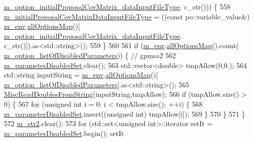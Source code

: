 \begin{DoxyCode}
{      \hyperlink{class_q_u_e_s_o_1_1_m_l_sampling_level_options_a75a15f2c496d82ce310669fb9de753c5}{m\_option\_initialProposalCovMatrix\_dataInputFileType}.
      c\_str())) \{
558     \hyperlink{class_q_u_e_s_o_1_1_m_l_sampling_level_options_a6e6ea2f36afd7b6a6900eaf44165a796}{m\_initialProposalCovMatrixDataInputFileType} = ((\textcolor{keyword}{const} 
      po::variable\_value&) \hyperlink{class_q_u_e_s_o_1_1_m_l_sampling_level_options_a5bdc1fb3f6eb46f73feec9c356c9a1b8}{m\_env}.\hyperlink{class_q_u_e_s_o_1_1_base_environment_ae7cee155956e0e70112f45e2ad1f02c8}{allOptionsMap}()[
      \hyperlink{class_q_u_e_s_o_1_1_m_l_sampling_level_options_a75a15f2c496d82ce310669fb9de753c5}{m\_option\_initialProposalCovMatrix\_dataInputFileType}.
      c\_str()]).as<std::string>();
559   \}
560 
561   \textcolor{keywordflow}{if} (\hyperlink{class_q_u_e_s_o_1_1_m_l_sampling_level_options_a5bdc1fb3f6eb46f73feec9c356c9a1b8}{m\_env}.\hyperlink{class_q_u_e_s_o_1_1_base_environment_ae7cee155956e0e70112f45e2ad1f02c8}{allOptionsMap}().count(
      \hyperlink{class_q_u_e_s_o_1_1_m_l_sampling_level_options_a296043cd6f00282ccf1a39e219aa16ef}{m\_option\_listOfDisabledParameters})) \{ \textcolor{comment}{// gpmsa2}
562     \hyperlink{class_q_u_e_s_o_1_1_m_l_sampling_level_options_a0c5c308a5b9e0150be59ad52a48e6ab9}{m\_parameterDisabledSet}.clear();
563     std::vector<double> tmpAllow(0,0.);
564     std::string inputString = \hyperlink{class_q_u_e_s_o_1_1_m_l_sampling_level_options_a5bdc1fb3f6eb46f73feec9c356c9a1b8}{m\_env}.\hyperlink{class_q_u_e_s_o_1_1_base_environment_ae7cee155956e0e70112f45e2ad1f02c8}{allOptionsMap}()[
      \hyperlink{class_q_u_e_s_o_1_1_m_l_sampling_level_options_a296043cd6f00282ccf1a39e219aa16ef}{m\_option\_listOfDisabledParameters}].as<std::string>();
565     \hyperlink{namespace_q_u_e_s_o_ac3fab438679d1dc864f8d629881dad2e}{MiscReadDoublesFromString}(inputString,tmpAllow);
566     \textcolor{keywordflow}{if} (tmpAllow.size() > 0) \{
567       \textcolor{keywordflow}{for} (\textcolor{keywordtype}{unsigned} \textcolor{keywordtype}{int} i = 0; i < tmpAllow.size(); ++i) \{
568         \hyperlink{class_q_u_e_s_o_1_1_m_l_sampling_level_options_a0c5c308a5b9e0150be59ad52a48e6ab9}{m\_parameterDisabledSet}.insert((\textcolor{keywordtype}{unsigned} \textcolor{keywordtype}{int}) tmpAllow[i]);
569       \}
570     \}
571   \}
572   \hyperlink{class_q_u_e_s_o_1_1_m_l_sampling_level_options_ab91c7af5bfcfeb0466970713e2655e3a}{m\_str2}.clear();
573   \textcolor{keywordflow}{for} (std::set<unsigned int>::iterator setIt = \hyperlink{class_q_u_e_s_o_1_1_m_l_sampling_level_options_a0c5c308a5b9e0150be59ad52a48e6ab9}{m\_parameterDisabledSet}.begin(); setIt
}
\end{DoxyCode}
